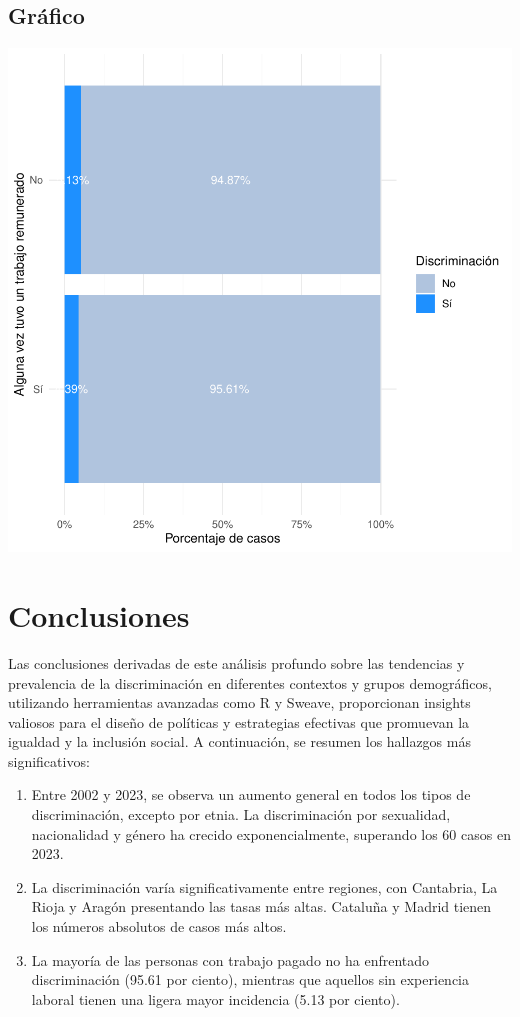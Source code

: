 \documentclass{article}
\begin{document}
\subsection{Gráfico}
\includegraphics{Informetecnico-005}


\section{Conclusiones}
Las conclusiones derivadas de este análisis profundo sobre las tendencias y prevalencia de la discriminación en diferentes contextos y grupos demográficos, utilizando herramientas avanzadas como R y Sweave, proporcionan insights valiosos para el diseño de políticas y estrategias efectivas que promuevan la igualdad y la inclusión social. A continuación, se resumen los hallazgos más significativos:

\begin{enumerate}
\item Entre 2002 y 2023, se observa un aumento general en todos los tipos de discriminación, excepto por etnia. La discriminación por sexualidad, nacionalidad y género ha crecido exponencialmente, superando los 60 casos en 2023.
\item La discriminación varía significativamente entre regiones, con Cantabria, La Rioja y Aragón presentando las tasas más altas. Cataluña y Madrid tienen los números absolutos de casos más altos.
\item La mayoría de las personas con trabajo pagado no ha enfrentado discriminación (95.61 por ciento), mientras que aquellos sin experiencia laboral tienen una ligera mayor incidencia (5.13 por ciento).
\end{enumerate}
\end{document}
